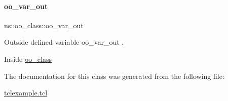 \paragraph{\texorpdfstring{oo\_var\_out}{oo\_var\_out}}
{\footnotesize\ttfamily ns\+::oo\+\_\+class\+::oo\+\_\+var\+\_\+out\hspace{0.3cm}{\ttfamily [static]}}



Outside defined variable {\ttfamily oo\+\_\+var\+\_\+out} . 

Inside \mbox{\hyperlink{classns_1_1oo__class}{oo\+\_\+class}} 
\begin{DoxyCode}{0}

\end{DoxyCode}


The documentation for this class was generated from the following file\+:\begin{DoxyCompactItemize}
\item 
\mbox{\hyperlink{tclexample_8tcl}{tclexample.\+tcl}}\end{DoxyCompactItemize}
